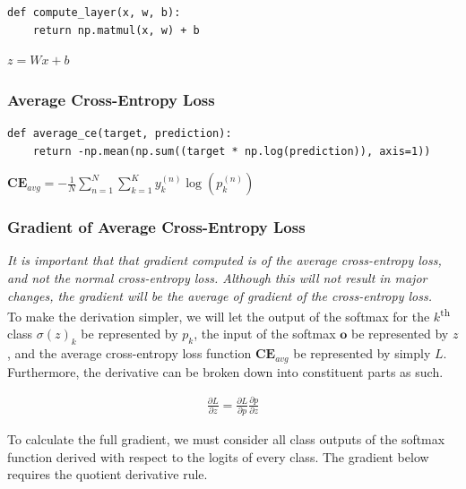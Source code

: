 \documentclass[letter]{article}
\begin{document}
\begin{lstlisting}
def compute_layer(x, w, b):
    return np.matmul(x, w) + b
\end{lstlisting}

$z = Wx + b$ \\

\subsubsection{Average Cross-Entropy Loss}

\begin{lstlisting}
def average_ce(target, prediction):
    return -np.mean(np.sum((target * np.log(prediction)), axis=1))
\end{lstlisting}

$\textbf{CE}_{avg} = -\frac{1}{N} \sum_{n = 1}^N \sum_{k = 1}^K y_k^{(n)} \log\left(p_k^{(n)}\right)$ \\

\subsubsection{Gradient of Average Cross-Entropy Loss}

\textit{It is important that that gradient computed is of the average cross-entropy loss, and not the normal cross-entropy loss. Although this will not result in major changes, the gradient will be the average of gradient of the cross-entropy loss.} \\

\noindent
To make the derivation simpler, we will let the output of the softmax for the $k$\textsuperscript{th} class $\sigma(z)_k$ be represented by $p_k$, the input of the softmax $\textbf{o}$ be represented by $z$, and the average cross-entropy loss function $\textbf{CE}_{avg}$ be represented by simply $L$. Furthermore, the derivative can be broken down into constituent parts as such.

\begin{align} \label{eqn:1}
\frac{\partial{L}}{\partial{z}} = \frac{\partial{L}}{\partial{p}} \frac{\partial{p}}{\partial{z}}
\end{align}

\noindent
To calculate the full gradient, we must consider all class outputs of the softmax function derived with respect to the logits of every class. The gradient below requires the quotient derivative rule.
\end{document}
